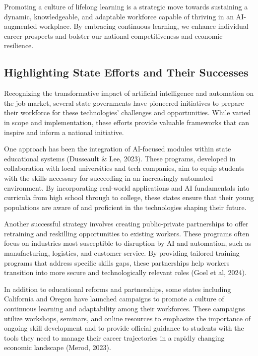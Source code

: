 \documentclass[11pt]{article}
\begin{document}
Promoting a culture of lifelong learning is a strategic move towards sustaining a dynamic, knowledgeable, and adaptable workforce capable of thriving in an AI-augmented workplace. By embracing continuous learning, we enhance individual career prospects and bolster our national competitiveness and economic resilience.

\subsection{Highlighting State Efforts and Their Successes}

Recognizing the transformative impact of artificial intelligence and automation on the job market, several state governments have pioneered initiatives to prepare their workforce for these technologies' challenges and opportunities. While varied in scope and implementation, these efforts provide valuable frameworks that can inspire and inform a national initiative.

One approach has been the integration of AI-focused modules within state educational systems (Dusseault \& Lee, 2023). These programs, developed in collaboration with local universities and tech companies, aim to equip students with the skills necessary for succeeding in an increasingly automated environment. By incorporating real-world applications and AI fundamentals into curricula from high school through to college, these states ensure that their young populations are aware of and proficient in the technologies shaping their future.

Another successful strategy involves creating public-private partnerships to offer retraining and reskilling opportunities to existing workers. These programs often focus on industries most susceptible to disruption by AI and automation, such as manufacturing, logistics, and customer service. By providing tailored training programs that address specific skills gaps, these partnerships help workers transition into more secure and technologically relevant roles (Goel et al, 2024).

In addition to educational reforms and partnerships, some states including California and Oregon have launched campaigns to promote a culture of continuous learning and adaptability among their workforces. These campaigns utilize workshops, seminars, and online resources to emphasize the importance of ongoing skill development and to provide official guidance to students with the tools they need to manage their career trajectories in a rapidly changing economic landscape (Merod, 2023).
\end{document}
